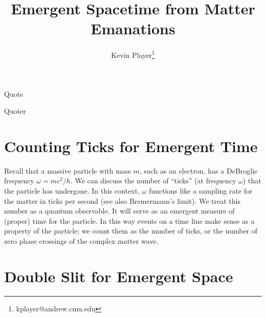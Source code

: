 \documentclass[12pt,a4paper]{article}
\begin{document}
\title{Emergent Spacetime from Matter Emanations}
\author[1]{Kevin Player\footnote{kplayer@andrew.cmu.edu}}

\maketitle

\epigraph{Quote}{Quoter}



 
\section{Counting Ticks for Emergent Time}

Recall that a massive particle with mass $m$, such as an electron, has a DeBroglie frequency $\omega = mc^2 / h$. We can discuss the number of ``ticks'' (at frequency $\omega$) that the particle has undergone. In this context, $\omega$ functions like a sampling rate for the matter in ticks per second (see also Bremermann's limit).  We treat this number as a quantum observable.  It will serve as an emergent measure of (proper) time for the particle.  In this way events on a time line make sense as a property of the particle; we count them as the number of ticks, or the number of zero phase crossings of the complex matter wave.

\section{Double Slit for Emergent Space}
\end{document}
